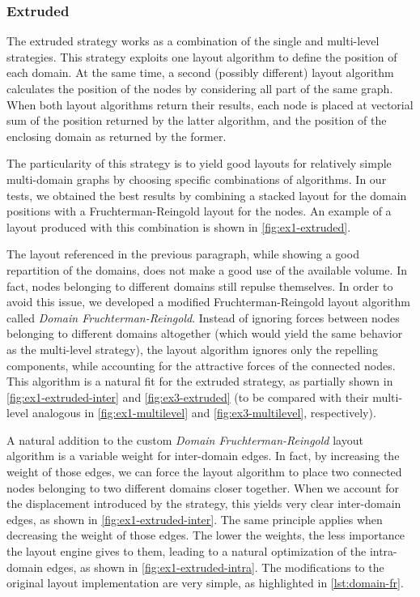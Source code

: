 \subsubsection{Extruded}

The extruded strategy works as a combination of the single and multi-level strategies. This strategy exploits one layout algorithm to define the position of each domain. At the same time, a second (possibly different) layout algorithm calculates the position of the nodes by considering all part of the same graph. When both layout algorithms return their results, each node is placed at vectorial sum of the position returned by the latter algorithm, and the position of the enclosing domain as returned by the former.

The particularity of this strategy is to yield good layouts for relatively simple multi-domain graphs by choosing specific combinations of algorithms. In our tests, we obtained the best results by combining a stacked layout for the domain positions with a Fruchterman-Reingold layout for the nodes. An example of a layout produced with this combination is shown in \vref{fig:ex1-extruded}.

The layout referenced in the previous paragraph, while showing a good repartition of the domains, does not make a good use of the available volume. In fact, nodes belonging to different domains still repulse themselves. In order to avoid this issue, we developed a modified Fruchterman-Reingold layout algorithm called \emph{Domain Fruchterman-Reingold}. Instead of ignoring forces between nodes belonging to different domains altogether (which would yield the same behavior as the multi-level strategy), the layout algorithm ignores only the repelling components, while accounting for the attractive forces of the connected nodes. This algorithm is a natural fit for the extruded strategy, as partially shown in \vref{fig:ex1-extruded-inter} and \vref{fig:ex3-extruded} (to be compared with their multi-level analogous in \vref{fig:ex1-multilevel} and \vref{fig:ex3-multilevel}, respectively).

A natural addition to the custom \emph{Domain Fruchterman-Reingold} layout algorithm is a variable weight for inter-domain edges. In fact, by increasing the weight of those edges, we can force the layout algorithm to place two connected nodes belonging to two different domains closer together. When we account for the displacement introduced by the strategy, this yields very clear inter-domain edges, as shown in \vref{fig:ex1-extruded-inter}. The same principle applies when decreasing the weight of those edges. The lower the weights, the less importance the layout engine gives to them, leading to a natural optimization of the intra-domain edges, as shown in \vref{fig:ex1-extruded-intra}. The modifications to the original layout implementation are very simple, as highlighted in \vref{lst:domain-fr}.

